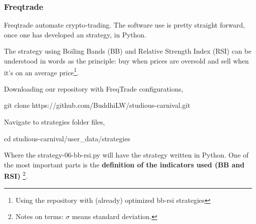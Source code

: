 \documentclass[
12pt,				%
openright,			%
oneside,			%
a4paper,			%
brazil,				%
english,			  %
]{abntex2}
\begin{document}




\subsubsection{Freqtrade}

Freqtrade automate crypto-trading. The software use is pretty straight
forward, once one has developed an strategy, in Python.

The strategy using Boiling Bands (BB) and Relative Strength Index
(RSI) can be understood in words as the principle: buy when prices are
oversold and sell when it's on an average price\footnote{Using the repository with (already) optimized bb-rsi strategies}.

Downloading our repository with FreqTrade configurations,
\begin{shell}
git clone https://github.com/BuddhiLW/studious-carnival.git
\end{shell}

Navigate to strategies folder files,
\begin{shell}
cd studious-carnival/user_data/strategies
\end{shell}

Where the strategy-06-bb-rsi.py will have the strategy written in Python. One of the most important parts is the \textbf{definition of the indicators used (BB and RSI)} \footnote{Notes on terms: $\sigma$ means standard deviation.}.
\end{document}
